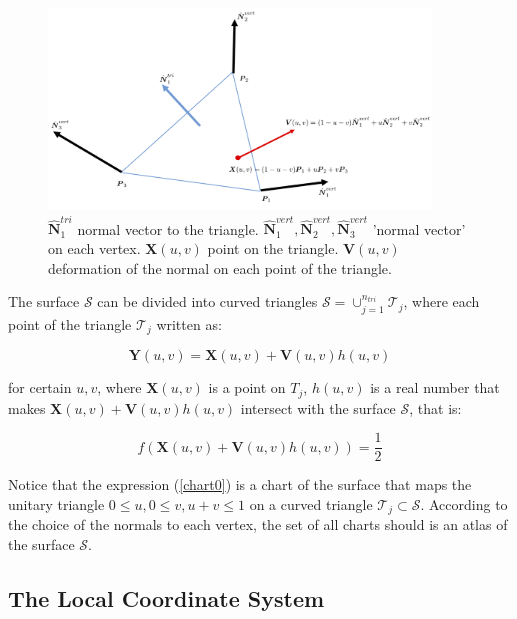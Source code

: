 \documentclass[11pt]{article}
\newcommand\bN{\boldsymbol N}
\newcommand\bX{\boldsymbol X}
\newcommand\bY{\boldsymbol Y}
\newcommand\bV{\boldsymbol V}
\begin{document}
\begin{figure}[H]
\begin{center}
\includegraphics[width=4in]{normal_vertex_3.png}%
\end{center}
\caption{$\hat{\bN}_1^{tri}$ normal vector to the triangle. $\hat{\bN}_1^{vert},\hat{\bN}_2^{vert},\hat{\bN}_3^{vert}$ 'normal vector' on each vertex. $\bX(u,v)$ point on the triangle. $\bV(u,v)$ deformation of the normal on each point of the triangle.}
\label{normalvert3}
\end{figure}


The surface $\mathcal{S}$ can be divided into curved triangles $\mathcal{S}=\cup_{j=1}^{n_{tri}}\mathcal{T}_j$, where each point of the triangle $\mathcal{T}_j$ written as:

\begin{equation}\label{chart0}
\bY(u,v)=\bX(u,v)+\bV(u,v)h(u,v)
\end{equation}

for certain $u,v$, where $\bX(u,v)$ is a point on $\mathit{T}_j$, $h(u,v)$ is a real number that makes $\bX(u,v)+\bV(u,v)h(u,v)$ intersect with the surface $\mathcal{S}$, that is:

\begin{equation}\label{newtoneq}
f(\bX(u,v)+\bV(u,v)h(u,v))=\frac{1}{2}
\end{equation}
 
Notice that the expression (\ref{chart0}) is a chart of the surface
that maps the unitary triangle $0\le u, 0\le v, u+v\le1$ on a curved
triangle $\mathcal{T}_j\subset \mathcal{S}$. According to the choice
of the normals to each vertex, the set of all charts should is an
atlas of the surface $\mathcal{S}$.





\subsection{The Local Coordinate System}
\end{document}
